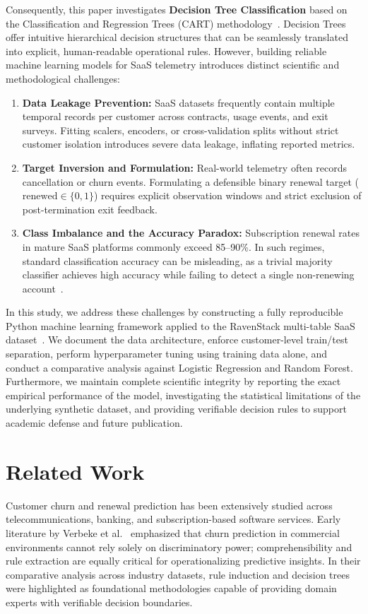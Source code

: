 \documentclass[pdflatex,sn-mathphys-num]{sn-jnl}
\begin{document}
Consequently, this paper investigates \textbf{Decision Tree Classification} based on the Classification and Regression Trees (CART) methodology~\cite{breiman1984classification}. Decision Trees offer intuitive hierarchical decision structures that can be seamlessly translated into explicit, human-readable operational rules. However, building reliable machine learning models for SaaS telemetry introduces distinct scientific and methodological challenges:
\begin{enumerate}
    \item \textbf{Data Leakage Prevention:} SaaS datasets frequently contain multiple temporal records per customer across contracts, usage events, and exit surveys. Fitting scalers, encoders, or cross-validation splits without strict customer isolation introduces severe data leakage, inflating reported metrics.
    \item \textbf{Target Inversion and Formulation:} Real-world telemetry often records cancellation or churn events. Formulating a defensible binary renewal target ($\text{renewed} \in \{0, 1\}$) requires explicit observation windows and strict exclusion of post-termination exit feedback.
    \item \textbf{Class Imbalance and the Accuracy Paradox:} Subscription renewal rates in mature SaaS platforms commonly exceed 85--90\%. In such regimes, standard classification accuracy can be misleading, as a trivial majority classifier achieves high accuracy while failing to detect a single non-renewing account~\cite{fawcett2006introduction,chawla2002smote}.
\end{enumerate}

In this study, we address these challenges by constructing a fully reproducible Python machine learning framework applied to the RavenStack multi-table SaaS dataset~\cite{rivalytics2025ravenstack}. We document the data architecture, enforce customer-level train/test separation, perform hyperparameter tuning using training data alone, and conduct a comparative analysis against Logistic Regression and Random Forest. Furthermore, we maintain complete scientific integrity by reporting the exact empirical performance of the model, investigating the statistical limitations of the underlying synthetic dataset, and providing verifiable decision rules to support academic defense and future publication.

\section{Related Work}\label{sec:related}
Customer churn and renewal prediction has been extensively studied across telecommunications, banking, and subscription-based software services. Early literature by Verbeke et al.~\cite{verbeke2012building} emphasized that churn prediction in commercial environments cannot rely solely on discriminatory power; comprehensibility and rule extraction are equally critical for operationalizing predictive insights. In their comparative analysis across industry datasets, rule induction and decision trees were highlighted as foundational methodologies capable of providing domain experts with verifiable decision boundaries.
\end{document}
